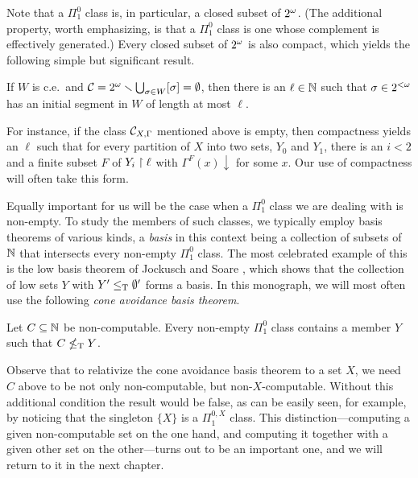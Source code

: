 Note that a $\Pi^0_1$ class is, in particular, a closed subset of ${2^{\omega}}$. (The additional property, worth emphasizing, is that a $\Pi^0_1$ class is one whose complement is effectively generated.) Every closed subset of ${2^{\omega}}$ is also compact, which yields the following simple but significant result.

\begin{lemma}
	If $W$ is c.e.\ and $\mathcal{C} = {2^{\omega}} \smallsetminus \bigcup_{\sigma \in W} [\sigma] = \emptyset$, then there is an $\ell \in \mathbb{N}$ such that $\sigma \in {2^{<\omega}}$ has an initial segment in $W$ of length at most $\ell$.
\end{lemma}

\noindent For instance, if the class $\mathcal{C}_{X,\Gamma}$ mentioned above is empty, then compactness yields an $\ell$ such that for every partition of $X$ into two sets, $Y_0$ and $Y_1$, there is an $i < 2$ and a finite subset $F$ of $Y_i \upharpoonright \ell$ with $\Gamma^F(x) \downarrow$ for some $x$. Our use of compactness will often take this form.

Equally important for us will be the case when a $\Pi^0_1$ class we are dealing with is non-empty. To study the members of such classes, we typically employ basis theorems of various kinds, a \emph{basis} in this context  being a collection of subsets of $\mathbb{N}$ that intersects every non-empty $\Pi^0_1$ class. The most celebrated example of this is the low basis theorem of Jockusch and Soare \cite[Theorem 2.1]{Jockusch197201}, which shows that the collection of low sets $Y$ with $Y' \leq_{\text{\upshape T}} \emptyset'$ forms a basis. In this monograph, we will most often use the following \emph{cone avoidance basis theorem}.

\begin{theorem}
	Let $C \subseteq \mathbb{N}$ be non-computable. Every non-empty $\Pi^0_1$ class contains a member $Y$ such that $C \nleq_{\text{\upshape T}} Y$.
\end{theorem}

\noindent Observe that to relativize the cone avoidance basis theorem to a set $X$, we need $C$ above to be not only non-computable, but non-$X$-computable. Without this additional condition the result would be false, as can be easily seen, for example, by noticing that the singleton $\{X\}$ is a $\Pi^{0,X}_1$ class. This distinction---computing a given non-computable set on the one hand, and computing it together with a given other set on the other---turns out to be an important one, and we will return to it in the next chapter.

